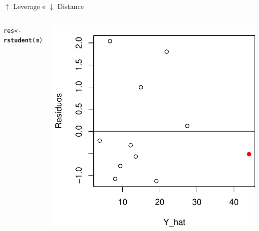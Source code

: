 \documentclass{beamer}\usepackage[]{graphicx}\usepackage[]{color}
\makeatletter
\newcommand{\hlstd}[1]{\textcolor[rgb]{0.345,0.345,0.345}{#1}}%
\newcommand{\hlkwb}[1]{\textcolor[rgb]{0.69,0.353,0.396}{#1}}%
\newcommand{\hlkwd}[1]{\textcolor[rgb]{0.737,0.353,0.396}{\textbf{#1}}}%
\newenvironment{kframe}{%
 \def\at@end@of@kframe{}%
 \ifinner\ifhmode%
  \def\at@end@of@kframe{\end{minipage}}%
  \begin{minipage}{\columnwidth}%
 \fi\fi%
 \def\FrameCommand##1{\hskip\@totalleftmargin \hskip-\fboxsep
 \colorbox{shadecolor}{##1}\hskip-\fboxsep
     \hskip-\linewidth \hskip-\@totalleftmargin \hskip\columnwidth}%
 \MakeFramed {\advance\hsize-\width
   \@totalleftmargin\z@ \linewidth\hsize
   \@setminipage}}%
 {\par\unskip\endMakeFramed%
 \at@end@of@kframe}
\newenvironment{knitrout}{}{} %
\renewenvironment{knitrout}{\setlength{\topsep}{0mm}}{}
\makeatother
\begin{document}
\begin{frame}{$\uparrow$ Leverage e $\downarrow$ Distance}
\begin{columns}[c]
\begin{knitrout}\tiny
{}\color{fgcolor}\begin{kframe}
\begin{alltt}
\hlstd{res} \hlkwb{<-} \hlkwd{rstudent}\hlstd{(m)}
\end{alltt}
\end{kframe}
\includegraphics[width=1\linewidth]{figure/inf101-1} 

\end{knitrout}

\end{columns}
\end{frame}
\end{document}
